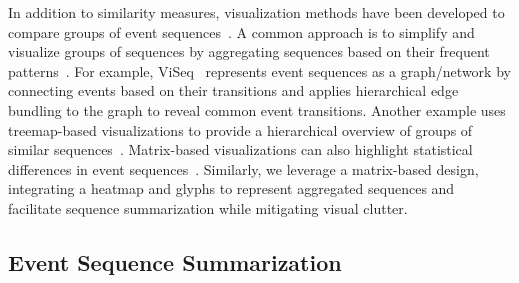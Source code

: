 \documentclass[preprint,journal]{vgtc}            %
\begin{document}
In addition to similarity measures, visualization methods have been developed to compare groups of event sequences~\cite{Sanne23Survey}. 
A common approach is to simplify and visualize groups of sequences by aggregating sequences based on their frequent patterns~\cite{Sanne23Survey}. 
For example, ViSeq~\cite{Chen20ViSeq} represents event sequences as a graph/network by connecting events based on their transitions and applies hierarchical edge bundling to the graph to reveal common event transitions. 
Another example uses treemap-based visualizations to provide a hierarchical overview of groups of similar sequences~\cite{Jang16MotionFlow}.
Matrix-based visualizations can also highlight statistical differences in event sequences~\cite{Kwon21DPVis, Wu14Visual, Xie21PassVizor}.
Similarly, we leverage a matrix-based design, integrating a heatmap and glyphs to represent aggregated sequences and facilitate sequence summarization while mitigating visual clutter.  



\subsection{Event Sequence Summarization}
\end{document}
